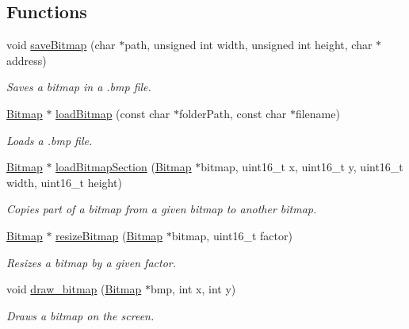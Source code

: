 \subsection*{Functions}
\begin{DoxyCompactItemize}
\item 
void \mbox{\hyperlink{group__bitmap_gacc8595ed81c710cecebe95f04db413fe}{save\+Bitmap}} (char $\ast$path, unsigned int width, unsigned int height, char $\ast$address)
\begin{DoxyCompactList}\small\item\em Saves a bitmap in a .bmp file. \end{DoxyCompactList}\item 
\mbox{\hyperlink{struct_bitmap}{Bitmap}} $\ast$ \mbox{\hyperlink{group__bitmap_ga627d64d58e9bf487fb6e326ea65df57b}{load\+Bitmap}} (const char $\ast$folder\+Path, const char $\ast$filename)
\begin{DoxyCompactList}\small\item\em Loads a .bmp file. \end{DoxyCompactList}\item 
\mbox{\hyperlink{struct_bitmap}{Bitmap}} $\ast$ \mbox{\hyperlink{group__bitmap_ga3f8f5ad40944f2db40792d7c4fe5b96e}{load\+Bitmap\+Section}} (\mbox{\hyperlink{struct_bitmap}{Bitmap}} $\ast$bitmap, uint16\+\_\+t x, uint16\+\_\+t y, uint16\+\_\+t width, uint16\+\_\+t height)
\begin{DoxyCompactList}\small\item\em Copies part of a bitmap from a given bitmap to another bitmap. \end{DoxyCompactList}\item 
\mbox{\hyperlink{struct_bitmap}{Bitmap}} $\ast$ \mbox{\hyperlink{group__bitmap_gaa19cec779e8cbaf053f3efc749c20c37}{resize\+Bitmap}} (\mbox{\hyperlink{struct_bitmap}{Bitmap}} $\ast$bitmap, uint16\+\_\+t factor)
\begin{DoxyCompactList}\small\item\em Resizes a bitmap by a given factor. \end{DoxyCompactList}\item 
void \mbox{\hyperlink{group__bitmap_ga37e42f0583efd18e7efa5a036798539e}{draw\+\_\+bitmap}} (\mbox{\hyperlink{struct_bitmap}{Bitmap}} $\ast$bmp, int x, int y)
\begin{DoxyCompactList}\small\item\em Draws a bitmap on the screen. \end{DoxyCompactList}\item 

\end{DoxyCompactItemize}
